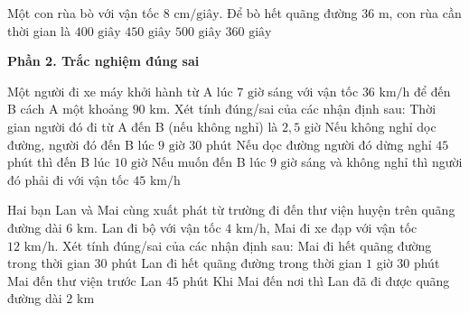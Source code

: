 \begin{ex} %
Một con rùa bò với vận tốc $8\text{ cm/giây}$. Để bò hết quãng đường $36\text{ m}$, con rùa cần thời gian là
\choice
{$400\text{ giây}$}
{\True $450\text{ giây}$}
{$500\text{ giây}$}
{$360\text{ giây}$}
\end{ex}

\textbf{Phần 2. Trắc nghiệm đúng sai}

\begin{ex} %
Một người đi xe máy khởi hành từ A lúc $7\text{ giờ}$ sáng với vận tốc $36\text{ km/h}$ để đến B cách A một khoảng $90\text{ km}$. Xét tính đúng/sai của các nhận định sau:
\choiceTF
{\True Thời gian người đó đi từ A đến B (nếu không nghỉ) là $2{,}5$ giờ}
{\True Nếu không nghỉ dọc đường, người đó đến B lúc $9\text{ giờ } 30\text{ phút}$}
{Nếu dọc đường người đó dừng nghỉ $45$ phút thì đến B lúc $10\text{ giờ}$}
{\True Nếu muốn đến B lúc $9\text{ giờ}$ sáng và không nghỉ thì người đó phải đi với vận tốc $45\text{ km/h}$}
\end{ex}

\begin{ex} %
Hai bạn Lan và Mai cùng xuất phát từ trường đi đến thư viện huyện trên quãng đường dài $6\text{ km}$. Lan đi bộ với vận tốc $4\text{ km/h}$, Mai đi xe đạp với vận tốc $12\text{ km/h}$. Xét tính đúng/sai của các nhận định sau:
\choiceTF
{\True Mai đi hết quãng đường trong thời gian $30$ phút}
{\True Lan đi hết quãng đường trong thời gian $1$ giờ $30$ phút}
{Mai đến thư viện trước Lan $45$ phút}
{\True Khi Mai đến nơi thì Lan đã đi được quãng đường dài $2\text{ km}$}
\end{ex}

